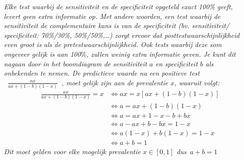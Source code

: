 \emph{\noindent Elke test waarbij de sensitiviteit en de specificiteit opgeteld exact 100\% geeft, levert geen extra informatie op. Met andere woorden, een test waarbij de sensitiviteit de complementaire kans is van de specificiteit (bv. sensitiviteit/ specificiteit: 70\%/30\%, 50\%/50\%,…) zorgt ervoor dat posttestwaarschijnlijkheid even groot is als de pretestwaarschijnlijkheid. Ook tests waarbij deze som ongeveer gelijk is aan 100$\%$, zullen weinig extra informatie geven. Je kunt dit nagaan door in het boomdiagram de sensitiviteit $a$ en specificiteit $b$ als onbekenden te nemen. De predictieve waarde na een positieve test $\;\;\frac{ax}{ax + (1-b)(1-x)}\;\;$, moet gelijk zijn aan de prevalentie $x$, waaruit volgt:}
\begin{align*}
 \quad  \frac{ax}{ax + (1-b)(1-x)} = x &\Leftrightarrow ax = x[ax + (1-b)(1-x)]\\
    &\Leftrightarrow a = ax + (1-b)(1-x) \\
    &\Leftrightarrow a = ax + 1-x - b + bx\\
    &\Leftrightarrow a - ax + b - bx = 1-x\\
    &\Leftrightarrow a(1-x) + b(1-x) = 1-x\\
    &\Leftrightarrow a + b = 1
\end{align*}
\emph{Dit moet gelden voor elke mogelijk prevalentie $x \in [0,1]$ dus\ $a + b = 1$}
\\
\eindewerktekst

